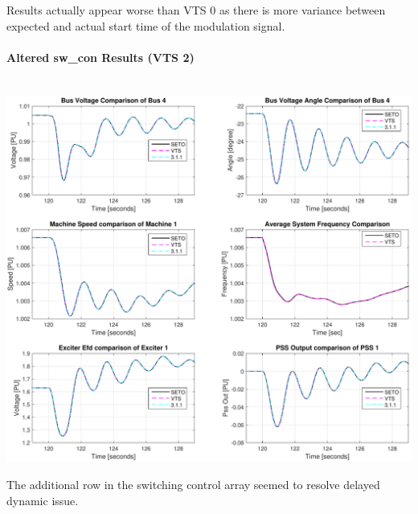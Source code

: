 \documentclass[12pt]{article}
\begin{document}
Results actually appear worse than VTS 0 as there is more variance between expected and actual start time of the modulation signal.

\pagebreak
\paragraph{Altered sw\_con Results (VTS 2)} \ \\

\includegraphics[width=\linewidth]{verCompDetail2ALT2}

The additional row in the switching control array seemed to resolve delayed dynamic issue.
\end{document}

